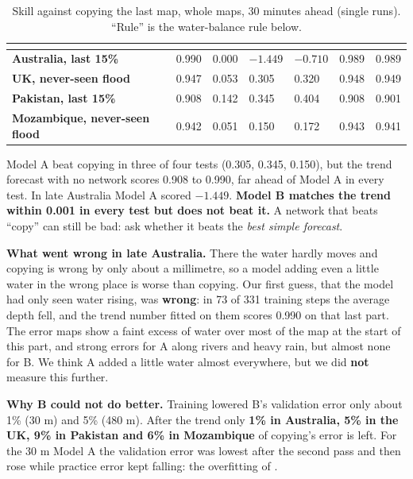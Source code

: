 \begin{table}[!htbp]
\centering\small
\caption{Skill against copying the last map, whole maps, 30 minutes ahead (single runs). ``Rule'' is the water-balance rule below.}\label{tab:p1}
\begin{tabularx}{\linewidth}{|>{\bfseries}p{3.5cm}|Y|Y|Y|Y|Y|Y|}
\hline
{}  &  &  &  &  &  & \\ \hline
Australia, last 15\% & 0.990 & 0.000 & $-1.449$ & $-0.710$ & 0.989 & 0.989\\ \hline
UK, never-seen flood & 0.947 & 0.053 & 0.305 & 0.320 & 0.948 & 0.949\\ \hline
Pakistan, last 15\% & 0.908 & 0.142 & 0.345 & 0.404 & 0.908 & 0.901\\ \hline
Mozambique, never-seen flood & 0.942 & 0.051 & 0.150 & 0.172 & 0.943 & 0.941\\ \hline
\end{tabularx}
\end{table}

Model A beat copying in three of four tests (0.305, 0.345, 0.150), but the trend forecast with no network scores 0.908 to 0.990, far ahead of Model A in every test. In late Australia Model A scored $-1.449$. \textbf{Model B matches the trend within 0.001 in every test but does not beat it.} A network that beats ``copy'' can still be bad: ask whether it beats the \emph{best simple forecast}.


\textbf{What went wrong in late Australia.} There the water hardly moves and copying is wrong by only about a millimetre, so a model adding even a little water in the wrong place is worse than copying. Our first guess, that the model had only seen water rising, was \textbf{wrong}: in 73 of 331 training steps the average depth fell, and the trend number fitted on them scores 0.990 on that last part. The error maps show a faint excess of water over most of the map at the start of this part, and strong errors for A along rivers and heavy rain, but almost none for B. We think A added a little water almost everywhere, but we did \textbf{not} measure this further.

\textbf{Why B could not do better.} Training lowered B's validation error only about 1\% (30 m) and 5\% (480 m). After the trend only \textbf{1\% in Australia, 5\% in the UK, 9\% in Pakistan and 6\% in Mozambique} of copying's error is left. For the 30 m Model A the validation error was lowest after the second pass and then rose while practice error kept falling: the overfitting of .

